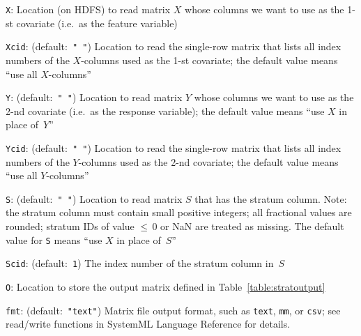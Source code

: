 \smallskip
{}
\begin{Description}
\item[{\tt X}:]
Location (on HDFS) to read matrix $X$ whose columns we want to use as
the 1-st covariate (i.e.~as the feature variable)
\item[{\tt Xcid}:] (default:\mbox{ }{\tt " "})
Location to read the single-row matrix that lists all index numbers
of the $X$-columns used as the 1-st covariate; the default value means
``use all $X$-columns''
\item[{\tt Y}:] (default:\mbox{ }{\tt " "})
Location to read matrix $Y$ whose columns we want to use as the 2-nd
covariate (i.e.~as the response variable); the default value means
``use $X$ in place of~$Y$''
\item[{\tt Ycid}:] (default:\mbox{ }{\tt " "})
Location to read the single-row matrix that lists all index numbers
of the $Y$-columns used as the 2-nd covariate; the default value means
``use all $Y$-columns''
\item[{\tt S}:] (default:\mbox{ }{\tt " "})
Location to read matrix $S$ that has the stratum column.
Note: the stratum column must contain small positive integers; all fractional
values are rounded; stratum IDs of value ${\leq}\,0$ or NaN are treated as
missing.  The default value for {\tt S} means ``use $X$ in place of~$S$''
\item[{\tt Scid}:] (default:\mbox{ }{\tt 1})
The index number of the stratum column in~$S$
\item[{\tt O}:]
Location to store the output matrix defined in Table~\ref{table:stratoutput}
\item[{\tt fmt}:] (default:\mbox{ }{\tt "text"})
Matrix file output format, such as {\tt text}, {\tt mm}, or {\tt csv};
see read/write functions in SystemML Language Reference for details.
\end{Description}


